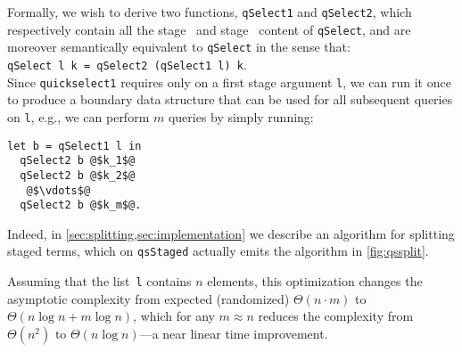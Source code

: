 Formally, we wish to derive two functions, \texttt{qSelect1} and
\texttt{qSelect2}, which respectively contain all the stage \bbone\ and stage
\bbtwo\ content of \texttt{qSelect}, and are moreover semantically equivalent to
\texttt{qSelect} in the sense that:
\\
\texttt{qSelect l k = qSelect2 (qSelect1 l) k}.
\\

Since \texttt{quickselect1} requires only on a first stage
argument \texttt{l}, we can run it once to produce a boundary data
structure that can be used for all subsequent queries on \texttt{l},
e.g., we can perform $m$ queries by simply running:
%
\begin{lstlisting}
let b = qSelect1 l in
  qSelect2 b @$k_1$@
  qSelect2 b @$k_2$@
   @$\vdots$@ 
  qSelect2 b @$k_m$@.
\end{lstlisting}

Indeed, in \ref{sec:splitting,sec:implementation} we describe an algorithm for
splitting staged terms, which on \texttt{qsStaged} actually emits the algorithm
in \ref{fig:qssplit}.

Assuming that the list~\texttt{l} contains $n$ elements, this optimization
changes the asymptotic complexity from expected (randomized) $\Theta(n \cdot m)$
to $\Theta(n\log{n} + m\log{n})$, which for any $m \approx n$ reduces the
complexity from $\Theta (n^2)$ to $\Theta(n\log{n})$---a near linear time
improvement. 



